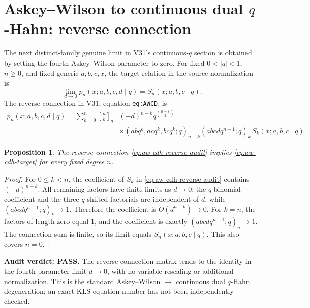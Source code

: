 \documentclass[11pt]{article}
\newtheorem{proposition}{Proposition}
\begin{document}
\section{Askey--Wilson to continuous dual $q$-Hahn: reverse connection}
The next distinct-family genuine limit in V31's continuous-$q$ section is obtained by setting the fourth Askey--Wilson parameter to zero. For fixed $0<|q|<1$, $n\geq0$, and fixed generic $a,b,c,x$, the target relation in the source normalization is
\begin{equation}\label{eq:aw-cdh-target}
\lim_{d\to0}p_n(x;a,b,c,d\mid q)=S_n(x;a,b,c\mid q).
\end{equation}
The reverse connection in V31, equation \texttt{eq:AWCD}, is
\begin{equation}\label{eq:aw-cdh-reverse-audit}
\begin{aligned}
p_n(x;a,b,c,d\mid q)=\sum_{k=0}^n {n\brack k}_q
&(-d)^{n-k}q^{\binom{n-k}{2}}\\[-2pt]
&\times(abq^k,acq^k,bcq^k;q)_{n-k}
(abcdq^{n-1};q)_k\,S_k(x;a,b,c\mid q).
\end{aligned}
\end{equation}
\begin{proposition}
The reverse connection \eqref{eq:aw-cdh-reverse-audit} implies \eqref{eq:aw-cdh-target} for every fixed degree $n$.
\end{proposition}
\begin{proof}
For $0\leq k<n$, the coefficient of $S_k$ in \eqref{eq:aw-cdh-reverse-audit} contains $(-d)^{n-k}$. All remaining factors have finite limits as $d\to0$: the $q$-binomial coefficient and the three $q$-shifted factorials are independent of $d$, while $(abcdq^{n-1};q)_k\to1$. Therefore the coefficient is $O(d^{n-k})\to0$. For $k=n$, the factors of length zero equal $1$, and the coefficient is exactly $(abcdq^{n-1};q)_n\to1$. The connection sum is finite, so its limit equals $S_n(x;a,b,c\mid q)$. This also covers $n=0$.
\end{proof}
\noindent\textbf{Audit verdict: PASS.} The reverse-connection matrix tends to the identity in the fourth-parameter limit $d\to0$, with no variable rescaling or additional normalization. This is the standard Askey--Wilson $\to$ continuous dual $q$-Hahn degeneration; an exact KLS equation number has not been independently checked.
\end{document}
